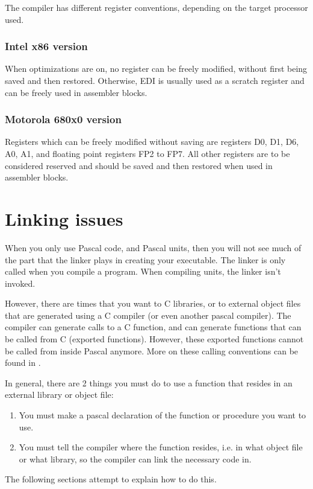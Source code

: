 \documentclass{report}
\begin{document}
The compiler has different register conventions, depending on the
target processor used.

\subsection{ Intel x86 version }

When optimizations are on, no register can be freely modified, without
first being saved and then restored. Otherwise, EDI is usually used as
a scratch register and can be freely used in assembler blocks.

\subsection{ Motorola 680x0 version }

Registers which can be freely modified without saving are registers
D0, D1, D6, A0, A1, and floating point registers FP2 to FP7. All other
registers are to be considered reserved and should be saved and then
restored when used in assembler blocks.

\chapter{Linking issues}
\label{ch:Linking}
When you only use Pascal code, and Pascal units, then you will not see much
of the part that the linker plays in creating your executable.
The linker is only called when you compile a program. When compiling units,
the linker isn't invoked.

However, there are times that you want to C libraries, or to external
object files that are generated using a C compiler (or even another pascal
compiler). The \fpc compiler can generate calls to a C function,
and can generate functions that can be called from C (exported functions).
However, these exported functions cannot be called from
inside Pascal anymore. More on these calling conventions can be found in
.

In general, there are 2 things you must do to use a function that resides in
an external library or object file:
\begin{enumerate}
\item You must make a pascal declaration of the function or procedure you
want to use.
\item You must tell the compiler where the function resides, i.e. in what
object file or what library, so the compiler can link the necessary code in.
\end{enumerate}
The following sections attempt to explain how to do this.
\end{document}
